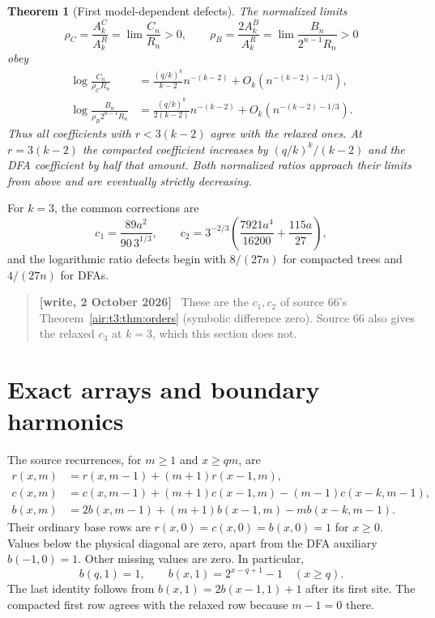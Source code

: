 \documentclass[11pt,letterpaper]{article}
\numberwithin{equation}{section}
\newtheorem{theorem}{Theorem}[section]
\theoremstyle{remark}
\newenvironment{writenote}{\par\smallskip\begin{quote}\small\textbf{[write, 2 October 2026]}\ }{\end{quote}\smallskip}
\begin{document}
\begin{theorem}[First model-dependent defects]\label{air:ka:thm:ratio}
The normalized limits
\[
 \rho_C=\frac{A_k^C}{A_k^R}=\lim\frac{C_n}{R_n}>0,
 \qquad
 \rho_B=\frac{2A_k^B}{A_k^R}=\lim\frac{B_n}{2^{n-1}R_n}>0
\]
obey
\begin{align}
 \log\frac{C_n}{\rho_CR_n}
 &=\frac{(q/k)^k}{k-2}n^{-(k-2)}
 +O_k(n^{-(k-2)-1/3}),\label{air:ka:eq:comp-ratio}\\
 \log\frac{B_n}{\rho_B2^{n-1}R_n}
 &=\frac{(q/k)^k}{2(k-2)}n^{-(k-2)}
 +O_k(n^{-(k-2)-1/3}).\label{air:ka:eq:dfa-ratio}
\end{align}
Thus all coefficients with $r<3(k-2)$ agree with the relaxed ones. At $r=3(k-2)$ the compacted coefficient increases by $(q/k)^k/(k-2)$ and the DFA coefficient by half that amount. Both normalized ratios approach their limits from above and are eventually strictly decreasing.
\end{theorem}
For $k=3$, the common corrections are
\[
 c_1=\frac{89a^2}{90\,3^{1/3}},\qquad
 c_2=3^{-2/3}\left(\frac{7921a^4}{16200}+\frac{115a}{27}\right),
\]
and the logarithmic ratio defects begin with $8/(27n)$ for compacted trees and $4/(27n)$ for DFAs.
\begin{writenote}
These are the $c_1,c_2$ of source 66's Theorem~\ref{air:t3:thm:orders} (symbolic difference zero). Source 66 also gives the relaxed $c_3$ at $k=3$, which this section does not.
\end{writenote}


\section{Exact arrays and boundary harmonics}\label{air:ka:sec:arrays}
The source recurrences, for $m\ge1$ and $x\ge qm$, are
\begin{align}
 r(x,m)&=r(x,m-1)+(m+1)r(x-1,m),\label{air:ka:eq:source-r}\\
 c(x,m)&=c(x,m-1)+(m+1)c(x-1,m)-(m-1)c(x-k,m-1),\\
 b(x,m)&=2b(x,m-1)+(m+1)b(x-1,m)-m b(x-k,m-1).
\end{align}
Their ordinary base rows are $r(x,0)=c(x,0)=b(x,0)=1$ for $x\ge0$. Values below the physical diagonal are zero, apart from the DFA auxiliary $b(-1,0)=1$. Other missing values are zero. In particular,
\[
 b(q,1)=1,\qquad b(x,1)=2^{x-q+1}-1\quad(x\ge q).
\]
The last identity follows from $b(x,1)=2b(x-1,1)+1$ after its first site. The compacted first row agrees with the relaxed row because $m-1=0$ there.
\end{document}

